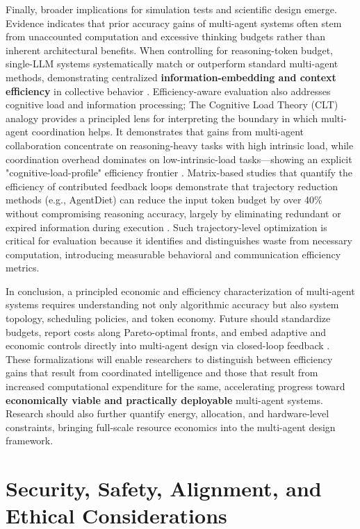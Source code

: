 \documentclass[11pt,a4paper]{article}
\begin{document}
Finally, broader implications for simulation tests and scientific design emerge. Evidence indicates that prior accuracy gains of multi-agent systems often stem from unaccounted computation and excessive thinking budgets rather than inherent architectural benefits. When controlling for reasoning-token budget, single-LLM systems systematically match or outperform standard multi-agent methods, demonstrating centralized \textbf{information-embedding and context efficiency} in collective behavior \cite{arxiv:2604.02460v2}. Efficiency-aware evaluation also addresses cognitive load and information processing; The Cognitive Load Theory (CLT) analogy provides a principled lens for interpreting the boundary in which multi-agent coordination helps. It demonstrates that gains from multi-agent collaboration concentrate on reasoning-heavy tasks with high intrinsic load, while coordination overhead dominates on low-intrinsic-load tasks---showing an explicit "cognitive-load-profile" efficiency frontier \cite{arxiv:2506.06843v3}. Matrix-based studies that quantify the efficiency of contributed feedback loops demonstrate that trajectory reduction methods (e.g., AgentDiet) can reduce the input token budget by over 40\% without compromising reasoning accuracy, largely by eliminating redundant or expired information during execution \cite{arxiv:2509.23586v2}. Such trajectory-level optimization is critical for evaluation because it identifies and distinguishes waste from necessary computation, introducing measurable behavioral and communication efficiency metrics.

In conclusion, a principled economic and efficiency characterization of multi-agent systems requires understanding not only algorithmic accuracy but also system topology, scheduling policies, and token economy. Future should standardize budgets, report costs along Pareto-optimal fronts, and embed adaptive and economic controls directly into multi-agent design via closed-loop feedback \cite{arxiv:2601.00481v1}. These formalizations will enable researchers to distinguish between efficiency gains that result from coordinated intelligence and those that result from increased computational expenditure for the same, accelerating progress toward \textbf{economically viable and practically deployable} multi-agent systems. Research should also further quantify energy, allocation, and hardware-level constraints, bringing full-scale resource economics into the multi-agent design framework.


\section{Security, Safety, Alignment, and Ethical Considerations}
\end{document}
